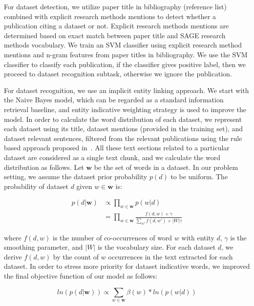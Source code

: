 For dataset detection, we utilize paper title in bibliography (reference list) combined with explicit research methods mentions to detect whether a publication citing a dataset or not. Explicit research methods mentions are determined based on exact match between paper title and SAGE research methods vocabulary. We train an SVM classifier using explicit research method mentions and n-gram features from paper titles in bibliography. We use the SVM classifier to classify each publication, if the classifier gives positive label, then we proceed to dataset recognition subtask, otherwise we ignore the publication.

For dataset recognition, we use an implicit entity linking approach. We start with the Naive Bayes model, which can be regarded as a standard information retrieval baseline, and entity indicative weighting strategy is used to improve the model. In order to calculate the word distribution of each dataset, we represent each dataset using its title, dataset mentions (provided in the training set), and dataset relevant sentences, filtered from the relevant publications using the rule based approach proposed in~\citet{Ghavimi2016IdentifyingAI}. All these text sections related to a particular dataset are considered as a single text chunk, and we calculate the word distribution as follows. Let $\textbf{w}$ be the set of words in a dataset. In our problem setting, we assume the dataset prior probability $p(d)$ to be uniform. The probability of dataset $d$ given $w \in \textbf{w}$ is:

\begin{equation}
\begin{split}
    p(d|\textbf{w}) & \propto \prod _{w \in \textbf{w}} p(w|d) \\
    & = \prod _{w \in \textbf{w}} \frac{f(d,w) + \gamma }{ \sum_{w'} f(d,w') + |W| \gamma}
\end{split}
\end{equation}

where $f(d, w)$ is the number of co-occurrences of word $w$ with entity $d$, $\gamma$ is the smoothing parameter, and $|W|$ is the vocabulary size. For each dataset $d$, we derive $f(d, w)$ by the count of $w$ occurrences in the text extracted for each dataset.
In order to stress more priority for dataset indicative words, we improved the final objective function of our model as follows:

\begin{equation}
ln(p(d|\textbf{w})) \propto \sum _{w \in \textbf{w}} \beta(w) * ln(p(w|d))
\end{equation}

